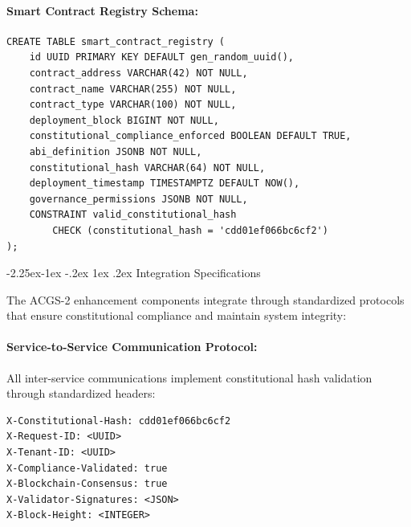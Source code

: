 \documentclass[manuscript,screen,9pt]{acmart}
\makeatletter
\renewcommand\subsection{\@startsection{subsection}{2}{\z@}%
  {-2.25ex\@plus -1ex \@minus -.2ex}%
  {1ex \@plus .2ex}%
  {\normalfont\large\bfseries}}
\makeatother
\begin{document}
\paragraph{Smart Contract Registry Schema:}
\begin{verbatim}
CREATE TABLE smart_contract_registry (
    id UUID PRIMARY KEY DEFAULT gen_random_uuid(),
    contract_address VARCHAR(42) NOT NULL,
    contract_name VARCHAR(255) NOT NULL,
    contract_type VARCHAR(100) NOT NULL,
    deployment_block BIGINT NOT NULL,
    constitutional_compliance_enforced BOOLEAN DEFAULT TRUE,
    abi_definition JSONB NOT NULL,
    constitutional_hash VARCHAR(64) NOT NULL,
    deployment_timestamp TIMESTAMPTZ DEFAULT NOW(),
    governance_permissions JSONB NOT NULL,
    CONSTRAINT valid_constitutional_hash
        CHECK (constitutional_hash = 'cdd01ef066bc6cf2')
);
\end{verbatim}

\subsection{Integration Specifications}
\label{app:integration_specifications}

The ACGS-2 enhancement components integrate through standardized protocols that ensure constitutional compliance and maintain system integrity:

\paragraph{Service-to-Service Communication Protocol:}
All inter-service communications implement constitutional hash validation through standardized headers:
\begin{verbatim}
X-Constitutional-Hash: cdd01ef066bc6cf2
X-Request-ID: <UUID>
X-Tenant-ID: <UUID>
X-Compliance-Validated: true
X-Blockchain-Consensus: true
X-Validator-Signatures: <JSON>
X-Block-Height: <INTEGER>
\end{verbatim}
\end{document}
